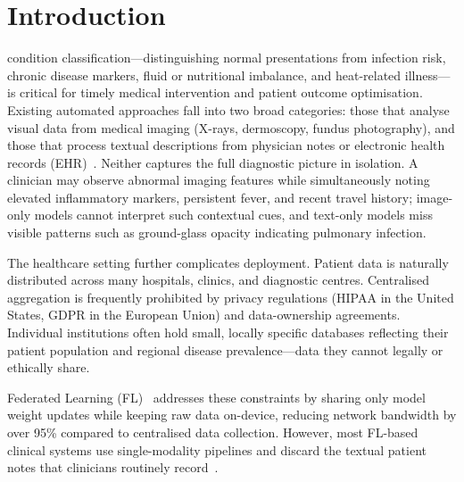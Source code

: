 \documentclass[conference]{IEEEtran}
\begin{document}
\section{Introduction}

 condition classification---distinguishing normal
presentations from infection risk, chronic disease markers, fluid or nutritional
imbalance, and heat-related illness---is critical for timely medical intervention
and patient outcome optimisation. Existing automated approaches fall into two
broad categories: those that analyse visual data from medical imaging (X-rays,
dermoscopy, fundus photography), and those that process textual descriptions
from physician notes or electronic health records
(EHR)~\cite{Rajpurkar2017,Irvin2019}. Neither captures the full diagnostic
picture in isolation. A clinician may observe abnormal imaging features while
simultaneously noting elevated inflammatory markers, persistent fever, and
recent travel history; image-only models cannot interpret such contextual
cues, and text-only models miss visible patterns such as ground-glass opacity
indicating pulmonary infection.

The healthcare setting further complicates deployment. Patient data is
naturally distributed across many hospitals, clinics, and diagnostic centres.
Centralised aggregation is frequently prohibited by privacy regulations
(HIPAA in the United States, GDPR in the European Union) and
data-ownership agreements. Individual institutions often hold small, locally
specific databases reflecting their patient population and regional
disease prevalence---data they cannot legally or ethically share.

Federated Learning (FL)~\cite{McMahan2017} addresses these constraints by
sharing only model weight updates while keeping raw data on-device, reducing
network bandwidth by over 95\% compared to centralised data collection.
However, most FL-based clinical systems use single-modality pipelines
and discard the textual patient notes that clinicians routinely
record~\cite{Sheller2020,Rieke2020,Kaissis2021}.
\end{document}
